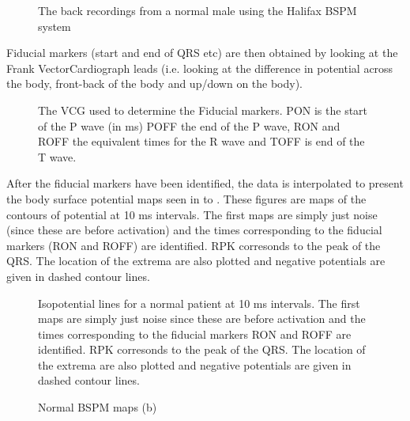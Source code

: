  \begin{figure}[htbp] \centering
 \caption[Normal BSPM recording - back]{The back recordings from a normal
   male using the Halifax BSPM system }
  \label{fig:hal-leads-norm-back}
\end{figure}

Fiducial markers (start and end of QRS etc) are then obtained by looking at
the Frank VectorCardiograph leads  (i.e. looking at the difference in potential
across the body, front-back of the body and up/down on the body). 

 \begin{figure}[htbp] \centering
 \caption[Normal VCG from Halifax system]{ The VCG used to determine the
   Fiducial markers. PON is the start of the P wave (in ms) POFF the end of
   the P wave, RON and ROFF the equivalent times for the R wave and TOFF is
   end of the T wave. }
  \label{fig:hal-vcg-normal}
\end{figure}

After the fiducial markers have been identified, the data is interpolated to
present the body surface potential maps seen in
 to . These figures
are maps of the contours of potential at 10 ms intervals.  The first maps are
simply just noise (since these are before activation) and the times
corresponding to the fiducial markers (RON and ROFF) are identified. RPK
corresonds to the peak of the QRS.  The location of the extrema are also
plotted and negative potentials are given in dashed contour lines. 

 \begin{figure}[htbp] \centering
 \caption[Normal BSPM maps (a)]{Isopotential lines for a normal patient at
 10 ms intervals.  The first maps are
simply just noise since these are before activation and the times
corresponding to the fiducial markers RON and ROFF are identified. RPK
corresonds to the peak of the QRS.  The location of the extrema are also
plotted and negative potentials are given in dashed contour lines.}
  \label{fig:hal-bspm-normala}
\end{figure}

\begin{figure}[htbp] \centering
 \caption[Normal BSPM maps (b)]{Normal BSPM maps (b) }
  \label{fig:hal-bspm-normalb}
\end{figure}

